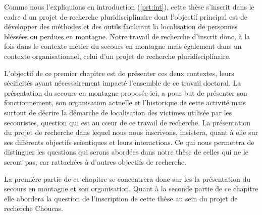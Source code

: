Comme nous l'expliquions en introduction (\autoref{prt:int}), cette
thèse s'inscrit dans le cadre d'un projet de recherche
pluridisciplinaire dont l'objectif principal est de développer des
méthodes et des outils facilitant la localisation de personnes
bléssées ou perdues en montagne. Notre travail de recherche d'inscrit
donc, à la fois dans le contexte métier du secours en montagne mais
également dans un contexte organisationnel, celui d'un projet de
recherche pluridisciplinaire.

L'objectif de ce premier chapitre est de présenter ces deux contextes,
leurs sécificités ayant nécessairement impacté l'ensemble de ce
travail doctoral. La présentation du secours en montagne proposée ici,
a pour but de présenter son fonctionnement, son organisation actuelle
et l'historique de cette activité mais surtout de décrire la démarche
de localisation des victimes utilisée par les secouristes, question
qui est au cœur de ce travail de recherche. La présentation du projet
de recherche dans lequel nous nous inscrivons, insistera, quant à elle
sur ses différents objectifs scientiques et leurs interactions. Ce qui
nous permettra de distinguer les questions qui serons abordées
dans notre thèse de celles qui ne le seront pas, car rattachées à
d'autres objectifs de recherche.

La première partie de ce chapitre se concentrera donc sur les la
présentation du secours en montagne et son organisation. Quant à la
seconde partie de ce chapitre elle abordera la question de
l'inscription de cette thèse au sein du projet de recherche Choucas.

